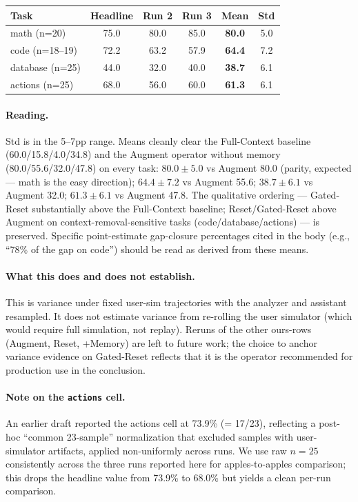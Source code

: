 \documentclass{article}
\begin{document}
\begin{center}
\begin{tabular}{lccccc}
\toprule
\textbf{Task} & \textbf{Headline} & \textbf{Run 2} & \textbf{Run 3} & \textbf{Mean} & \textbf{Std} \\
\midrule
math (n=20)     & 75.0 & 80.0 & 85.0 & \textbf{80.0} & 5.0 \\
code (n=18--19) & 72.2 & 63.2 & 57.9 & \textbf{64.4} & 7.2 \\
database (n=25) & 44.0 & 32.0 & 40.0 & \textbf{38.7} & 6.1 \\
actions (n=25)  & 68.0 & 56.0 & 60.0 & \textbf{61.3} & 6.1 \\
\bottomrule
\end{tabular}
\end{center}

\paragraph{Reading.} Std is in the 5--7pp range. Means cleanly clear the Full-Context baseline (60.0/15.8/4.0/34.8) and the Augment operator without memory (80.0/55.6/32.0/47.8) on every task: $80.0 \pm 5.0$ vs Augment 80.0 (parity, expected --- math is the easy direction); $64.4 \pm 7.2$ vs Augment 55.6; $38.7 \pm 6.1$ vs Augment 32.0; $61.3 \pm 6.1$ vs Augment 47.8. The qualitative ordering --- Gated-Reset substantially above the Full-Context baseline; Reset/Gated-Reset above Augment on context-removal-sensitive tasks (code/database/actions) --- is preserved. Specific point-estimate gap-closure percentages cited in the body (e.g., ``78\% of the gap on code'') should be read as derived from these means.

\paragraph{What this does and does not establish.} This is variance under fixed user-sim trajectories with the analyzer and assistant resampled. It does not estimate variance from re-rolling the user simulator (which would require full simulation, not replay). Reruns of the other ours-rows (Augment, Reset, +Memory) are left to future work; the choice to anchor variance evidence on Gated-Reset reflects that it is the operator recommended for production use in the conclusion.

\paragraph{Note on the \texttt{actions} cell.} An earlier draft reported the actions cell at 73.9\% (= 17/23), reflecting a post-hoc ``common 23-sample'' normalization that excluded samples with user-simulator artifacts, applied non-uniformly across runs. We use raw $n{=}25$ consistently across the three runs reported here for apples-to-apples comparison; this drops the headline value from 73.9\% to 68.0\% but yields a clean per-run comparison.
\end{document}
